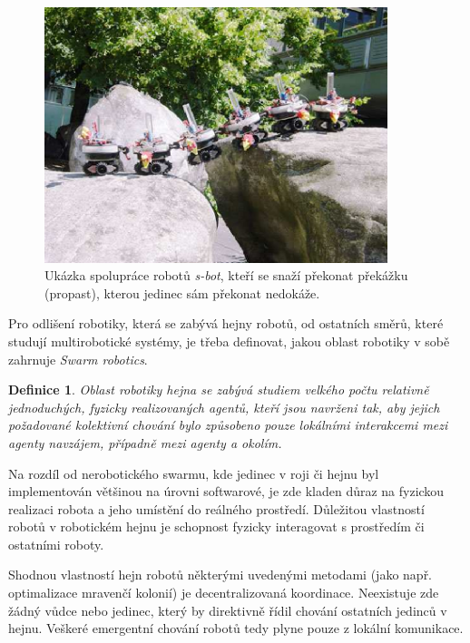 \documentclass[a4paper,12pt]{article}
\newtheorem{define}{Definice}
\begin{document}
\begin{figure}[here]
  \centering
  \includegraphics[width=10cm]{./img/sbot.png}
  \caption{Ukázka spolupráce robotů {\it s-bot}, kteří se snaží překonat překážku
    (propast), kterou jedinec sám překonat nedokáže.}
\end{figure}

Pro odlišení robotiky, která se zabývá hejny robotů, od ostatních směrů, které
studují multirobotické systémy, je třeba definovat, jakou oblast robotiky v sobě
zahrnuje {\it Swarm robotics}.

\begin{define} Oblast robotiky hejna se zabývá studiem
velkého počtu relativně jednoduchých, fyzicky realizovaných agentů, kteří jsou
navrženi tak, aby jejich požadované kolektivní chování bylo způsobeno pouze
lokálními interakcemi mezi agenty navzájem, případně mezi agenty a okolím.
\cite{Sahin05}
\end{define}

Na rozdíl od nerobotického swarmu, kde jedinec v roji či hejnu byl implementován
většinou na úrovni softwarové, je zde kladen důraz na fyzickou realizaci robota
a jeho umístění do reálného prostředí. Důležitou vlastností robotů v robotickém
hejnu je schopnost fyzicky interagovat s prostředím či ostatními roboty.

Shodnou vlastností hejn robotů některými uvedenými metodami (jako např. optimalizace
mravenčí kolonií) je decentralizovaná koordinace. Neexistuje zde žádný vůdce
nebo jedinec, který by direktivně řídil chování ostatních jedinců v hejnu.
Veškeré emergentní chování robotů tedy plyne pouze z lokální komunikace.
\end{document}
